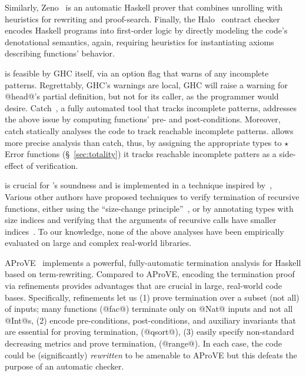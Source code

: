 Similarly, Zeno~\cite{ZENO} is an automatic Haskell 
prover that combines unrolling with heuristics for rewriting
and proof-search. 
%
Finally, the Halo~\cite{halo} contract checker encodes 
Haskell programs into first-order logic by directly 
modeling the code's denotational semantics,
again, requiring heuristics for instantiating axioms 
describing functions' behavior.
%


is feasible by GHC itself, via an option flag that warns of any incomplete patterns.
%
Regrettably, GHC's warnings are local, \ie
GHC will raise a warning for @head@'s partial definition, 
but not for its caller, as the programmer would desire.
%
Catch~\cite{catch}, 
a fully automated tool that tracks incomplete patterns,
addresses the above issue
%
by computing functions' pre- and post-conditions.
Moreover, catch statically analyses the code 
to track reachable incomplete patterns.
%
\toolname allows more precise analysis than catch, 
thus, by assigning the appropriate
types to $\star$Error functions (\S~\ref{sec:totality}) 
it tracks reachable incomplete patters 
as a side-effect of verification.

is crucial for \toolname's soundness 
and is implemented in a technique inspired by~\cite{XiTerminationLICS01}, 
%
Various other authors have proposed techniques to verify termination of
recursive functions, either using the ``size-change
principle''~\cite{JonesB04,Sereni05}, or by annotating types with size indices
and verifying that the arguments of recursive calls have smaller
indices~\cite{HughesParetoSabry96,BartheTermination}.
%
To our knowledge, none of the above analyses have been empirically
evaluated on large and complex real-world libraries.

AProVE~\cite{Giesl11} implements a powerful, fully-automatic
termination analysis for Haskell based on term-rewriting.
%
Compared to AProVE,
encoding the termination proof via 
refinements provides advantages that are crucial in 
large, real-world code bases. 
Specifically, refinements
let us
%
(1) prove termination over a subset 
    (not all) of inputs; many functions (\eg @fac@) 
    terminate only on @Nat@ inputs and not all @Int@s,
%
(2) encode pre-conditions, 
    post-conditions, and auxiliary invariants that 
    are essential for proving termination, (\eg @qsort@),
%
(3) easily specify non-standard 
    decreasing metrics and prove termination, (\eg @range@).
%
In each case, the code could be (significantly) 
\emph{rewritten} to be amenable to AProVE but this defeats
the purpose of an automatic checker.
%


